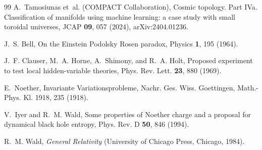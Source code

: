 \documentclass[
  aps,
  prd,
  reprint,
  superscriptaddress,
  nofootinbib,
  longbibliography,
  floatfix,
  amsmath,
  amssymb
]{revtex4-2}
\theoremstyle{plain}
\theoremstyle{definition}
\theoremstyle{remark}
\begin{document}
\begin{thebibliography}{99}
A.~Tamosiunas et~al. (COMPACT Collaboration),
Cosmic topology. Part IVa. Classification of manifolds using machine learning: a case study with small toroidal universes,
JCAP \textbf{09}, 057 (2024), arXiv:2404.01236.


J.~S. Bell,
On the Einstein Podolsky Rosen paradox,
Physics \textbf{1}, 195 (1964).

J.~F. Clauser, M.~A. Horne, A.~Shimony, and R.~A. Holt,
Proposed experiment to test local hidden-variable theories,
Phys. Rev. Lett. \textbf{23}, 880 (1969).

E.~Noether,
Invariante Variationsprobleme,
Nachr. Ges. Wiss. Goettingen, Math.-Phys. Kl. 1918, 235 (1918).

V.~Iyer and R.~M. Wald,
Some properties of Noether charge and a proposal for dynamical black hole entropy,
Phys. Rev. D \textbf{50}, 846 (1994).

R.~M. Wald,
\textit{General Relativity}
(University of Chicago Press, Chicago, 1984).

\end{thebibliography}
\end{document}
